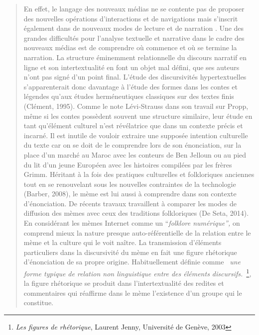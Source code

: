 \begin{quote}
En effet, le langage des nouveaux m\'edias ne se contente pas de proposer des nouvelles op\'erations d{\textquoteright}interactions et de navigations mais s{\textquoteright}inscrit \'egalement dans de nouveaux modes de lecture et de narration \cite{Manovich2001}. Une des grandes difficult\'es pour l{\textquoteright}analyse textuelle et narrative dans le cadre des nouveaux m\'edias est de comprendre o\`u commence et o\`u se termine la narration. La structure \'eminemment relationnelle du discours narratif en ligne et son intertextualit\'e en font un objet mal d\'efini, que ses auteurs n{\textquoteright}ont pas sign\'e d{\textquoteright}un point final. L{\textquoteright}\'etude des discursivit\'es hypertextuelles s{\textquoteright}apparenterait donc davantage \`a l{\textquoteright}\'etude des formes dans les contes et l\'egendes qu{\textquoteright}aux \'etudes herm\'eneutiques classiques sur des textes finis (Cl\'ement, 1995). Comme le note L\'evi-Strauss dans son travail sur Propp, m\^eme si les contes poss\`edent souvent une structure similaire, leur \'etude en tant qu{\textquoteright}\'el\'ement culturel n{\textquoteright}est r\'ev\'elatrice que dans un contexte pr\'ecis et incarn\'e. Il est inutile de vouloir extraire une suppos\'ee intention culturelle du texte car on se doit de le comprendre lors de son \'enonciation, sur la place d{\textquoteright}un march\'e au Maroc avec les conteurs de Ben Jelloun ou au pied du lit d{\textquoteright}un jeune Europ\'een avec les histoires compil\'ees par les fr\`eres Grimm. H\'eritant \`a la fois des pratiques culturelles et folkloriques anciennes tout en se renouvelant sous les nouvelles contraintes de la technologie (Barber, 2008), le m\`eme est lui aussi \`a comprendre dans son contexte d{\textquoteright}\'enonciation. De r\'ecents travaux travaillent \`a comparer les modes de diffusion des m\`emes avec ceux des traditions folkloriques (De Seta, 2014). En consid\'erant les m\`emes Internet comme un {\textquotedblleft}\textit{folklore num\'erique{\textquotedblright}, }on comprend mieux la nature presque auto-r\'ef\'erentielle de la relation entre le m\`eme et la culture qui le voit na\^itre. La transmission d{\textquoteright}\'el\'ements particuliers dans la discursivit\'e du m\`eme en fait une figure rh\'etorique d{\textquoteright}\'enonciation de sa propre origine. Habituellement d\'efinie comme \textit{{\guillemotleft}~une forme typique de relation non linguistique entre des \'el\'ements discursifs.~{\guillemotright}}\footnote{ \textit{Les figures de rh\'etorique}, Laurent Jenny, Universit\'e de Gen\`eve, 2003}\textit{, }la figure rh\'etorique se produit dans l{\textquoteright}intertextualit\'e des redites et commentaires qui r\'eaffirme dans le m\`eme l{\textquoteright}existence d{\textquoteright}un groupe qui le constitue.  

\end{quote}
